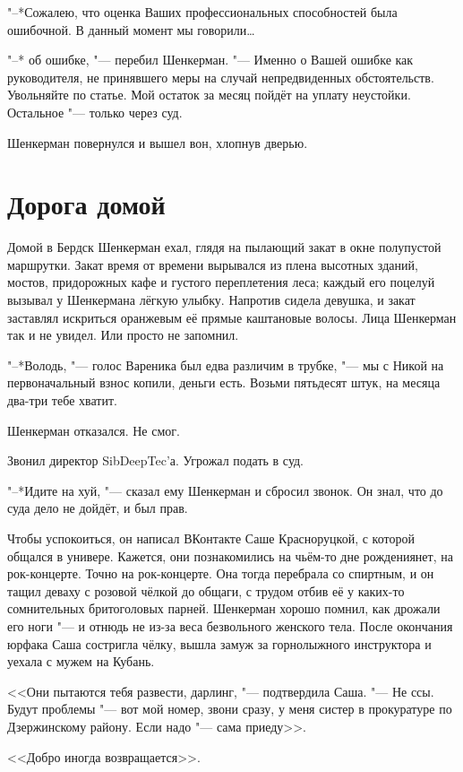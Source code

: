 "--*Сожалею, что оценка Ваших профессиональных способностей была ошибочной.
В данный момент мы говорили\ldots

"--* \ldotst об ошибке, "--- перебил Шенкерман.
"--- Именно о Вашей ошибке как руководителя, не принявшего меры на случай непредвиденных обстоятельств.
Увольняйте по статье.
Мой остаток за месяц пойдёт на уплату неустойки.
Остальное "--- только через суд.

Шенкерман повернулся и вышел вон, хлопнув дверью.

\section{Дорога домой}

Домой в Бердск Шенкерман ехал, глядя на пылающий закат в окне полупустой маршрутки.
Закат время от времени вырывался из плена высотных зданий, мостов, придорожных кафе и густого переплетения леса;
каждый его поцелуй вызывал у Шенкермана лёгкую улыбку.
Напротив сидела девушка, и закат заставлял искриться оранжевым её прямые каштановые волосы.
Лица Шенкерман так и не увидел.
Или просто не запомнил.

"--*Володь, "--- голос Вареника был едва различим в трубке, "--- мы с Никой на первоначальный взнос копили, деньги есть.
Возьми пятьдесят штук, на месяца два-три тебе хватит.

Шенкерман отказался.
Не смог.

Звонил директор SibDeepTec'а.
Угрожал подать в суд.

"--*Идите на хуй, "--- сказал ему Шенкерман и сбросил звонок.
Он знал, что до суда дело не дойдёт, и был прав.

Чтобы успокоиться, он написал ВКонтакте Саше Красноруцкой, с которой общался в универе.
Кажется, они познакомились на чьём-то дне рождения\ldotst нет, на рок-концерте.
Точно на рок-концерте.
Она тогда перебрала со спиртным, и он тащил деваху с розовой чёлкой до общаги, с трудом отбив её у каких-то сомнительных бритоголовых парней.
Шенкерман хорошо помнил, как дрожали его ноги "--- и отнюдь не из-за веса безвольного женского тела.
После окончания юрфака Саша состригла чёлку, вышла замуж за горнолыжного инструктора и уехала с мужем на Кубань.

<<Они пытаются тебя развести, дарлинг, "--- подтвердила Саша.
"--- Не ссы.
Будут проблемы "--- вот мой номер, звони сразу, у меня систер в прокуратуре по Дзержинскому району.
Если надо "--- сама приеду>>.

<<Добро иногда возвращается>>.

